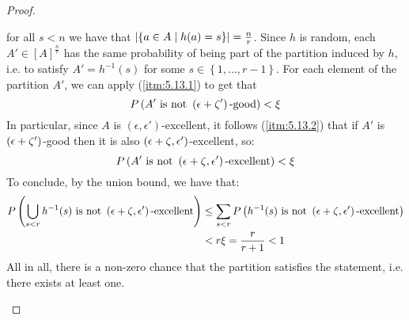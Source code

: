 \begin{proof}
\begin{enumerate}[label=(\alph*), ref=\alph*]
                for all $s < n$ we have that $\left| \left\{ a \in A \mid h(a) = s \right\} \right| = \frac{n}{r}$.
                Since $h$ is random, each $A' \in [A]^\frac{n}{r}$ has the same probability of being part of the partition
                induced by $h$, i.e. to satisfy $A' = h^{-1}(s)$ for some $s \in \left\{ 1, \dots, r-1 \right\}$.
                For each element of the partition $A'$, we can apply (\ref{itm:5.13.1}) to get that
                $$
                    P\left( A' \text{ is not } \left( \epsilon + \zeta' \right)\text{-good} \right) < \xi
                $$
                In particular, since $A$ is $(\epsilon, \epsilon')$-excellent, it follows (\ref{itm:5.13.2}) that if $A'$ is
                $\left( \epsilon + \zeta' \right)$-good then it is also $\left( \epsilon + \zeta, \epsilon' \right)$-excellent, so:
                $$
                    P\left( A' \text{ is not } \left( \epsilon + \zeta, \epsilon' \right)\text{-excellent} \right) < \xi
                $$
                To conclude, by the union bound, we have that:
                \begin{align*}
                    P\left( \bigcup_{s < r} h^{-1}(s) \text{ is not } \left( \epsilon + \zeta, \epsilon' \right)\text{-excellent} \right)
                        & \leq \sum_{s < r} P\left( h^{-1}(s) \text{ is not } \left( \epsilon + \zeta, \epsilon' \right)\text{-excellent} \right) \\
                        & < r \xi = \frac{r}{r+1} < 1
                \end{align*}
                All in all, there is a non-zero chance that the partition satisfies the statement, i.e. there exists at least one.
        \end{enumerate}
        \end{proof}

